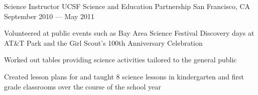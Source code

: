 \begin{cventries}
  \cventry
  {Science Instructor} %
  {UCSF Science and Education Partnership} %
  {San Francisco, CA} %
  {September 2010 --- May 2011} %
  {
    \begin{cvitems} %
    \item Volunteered at public events such as Bay Area Science Festival Discovery days at AT\&T Park and the Girl Scout's 100th Anniversary Celebration
    \item Worked out tables providing science activities tailored to the general public
    \item Created lesson plans for and taught 8 science lessons in kindergarten and first grade classrooms over the course of the school year
    \end{cvitems}
  }

\end{cventries}
